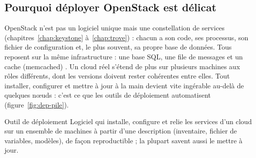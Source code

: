 \subsection{Pourquoi déployer OpenStack est délicat}\label{sec:dep-pourquoi}

OpenStack n'est pas un logiciel unique mais une constellation de services (chapitres~\ref{chap:keystone} à~\ref{chap:trove}) :
chacun a son code, ses processus, son fichier de configuration et, le plus souvent, sa propre base de données. Tous reposent sur la
même infrastructure : une base SQL, une file de messages et un cache (\gls{memcached}) \parencite{install-env}. Un cloud réel
s'étend de plus sur plusieurs machines aux rôles différents, dont les versions doivent rester cohérentes entre elles. Tout installer,
configurer et mettre à jour à la main devient vite ingérable au-delà de quelques nœuds : c'est ce que les outils de déploiement
automatisent (figure~\ref{fig:dep-pile}).

\begin{definition}{Outil de déploiement}
Logiciel qui installe, configure et relie les services d'un cloud sur un ensemble de machines à partir d'une description
(inventaire, fichier de variables, modèles), de façon reproductible ; la plupart savent aussi le mettre à jour.
\end{definition}

